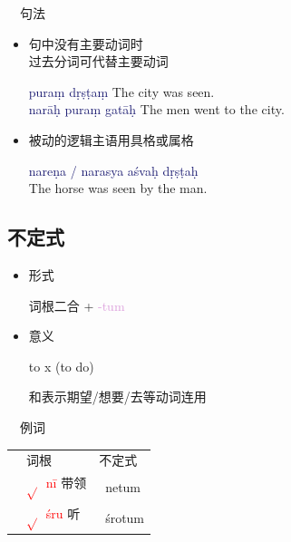 \documentclass[17pt]{beamer}
\newcommand{\skt}[1]{{\sanskritfont{#1}}} %
\newcommand{\verbroot}[1]{\textcolor{red}{$\sqrt{}$#1}}
\newcommand{\sktroot}[1]{{\verbroot{\skt{#1}}}}
\newcommand{\skttransroot}[1]{{\sktroot{#1}~\textcolor{red}{#1}}}
\newcommand{\fullpada}[1]{\textcolor{OliveGreen}{#1}}
\newcommand{\sktpada}[1]{{\textcolor{OliveGreen}{\skt{#1}}}}
\newcommand{\skttranspada}[1]{{\sktpada{#1}~\fullpada{#1}}}
\newcommand{\pratyaya}[1]{\textcolor{Plum}{#1}}
\newcommand{\fullsentence}[1]{\textcolor{MidnightBlue}{#1}}
\begin{document}
\begin{frame}{\insertsubsection ~~句法}
  \begin{itemize}
    \item 句中没有主要动词时\\过去分词可代替主要动词
    
    \fullsentence{puraṃ dṛṣṭaṃ} The city was seen. \\
    \fullsentence{narāḥ puraṃ gatāḥ} The men went to the city.
    \item 被动的逻辑主语用具格或属格
    
    \fullsentence{nareṇa / narasya aśvaḥ dṛṣṭaḥ} \\
    The horse was seen by the man.
  \end{itemize}
\end{frame}

\subsection{不定式}
\begin{frame}{\insertsubsection }
  \begin{itemize}
    \item 形式
    
    词根二合 + \pratyaya{\nobreakdash-tum} 

    \item 意义
    
    to x (to do)
    
    和表示期望/想要/去等动词连用
  \end{itemize}
\end{frame}

\begin{frame}{\insertsubsection ~~例词}
  \centering
  \begin{tabular}{@{}lll@{}} %
    & 词根 & 不定式  \\
    & \skttransroot{nī} 带领 & \skttranspada{netum}  \\
    & \skttransroot{śru} 听 & \skttranspada{śrotum}  \\ 
  \end{tabular}
\end{frame}
\end{document}
